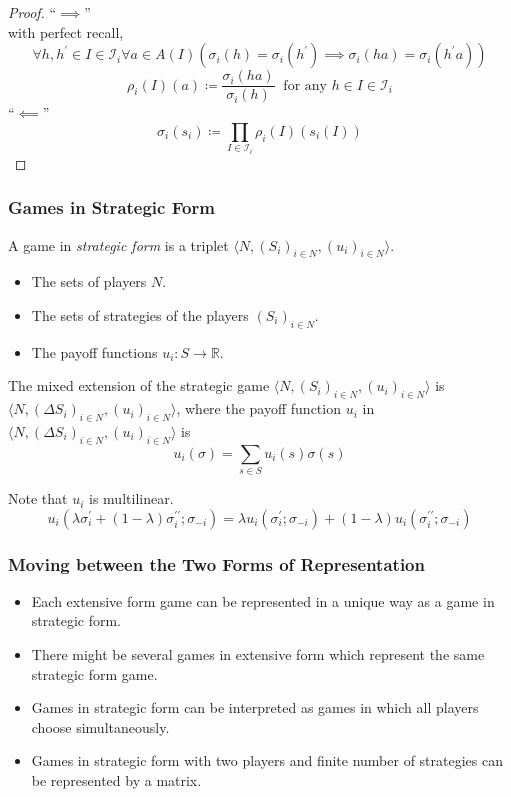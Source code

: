 \documentclass[UTF8,11pt,colorlinks,compress,openany]{beamer}%
\begin{document}
\begin{frame}\frametitle{}
\begin{proof}
	``$\implies$''\\
	with perfect recall,
	\[\forall h,h^\prime\in I\in\mathcal{I}_i\forall a\in A(I)\left(\sigma_i(h)=\sigma_i(h^\prime)\implies\sigma_i(ha)=\sigma_i(h^\prime a)\right)\]
	\[\rho_i(I)(a)\coloneqq \dfrac{\sigma_i(ha)}{\sigma_i(h)}\;\;\text{for any $h\in I\in\mathcal{I}_i$}\]
	``$\impliedby$''
	\[\sigma_i(s_i)\coloneqq \prod\limits_{I\in\mathcal{I}_i}\rho_i(I)(s_i(I))\]
\end{proof}
\end{frame}

\begin{frame}\frametitle{Games in Strategic Form}
\begin{definition}
	A game in \emph{strategic form} is a triplet $\langle N,(S_i)_{i\in N},(u_i)_{i\in N}\rangle$.
	\begin{itemize}
		\item The sets of players $N$.
		\item The sets of strategies of the players $(S_i)_{i\in N}$.
		\item The payoff functions $u_i: S\to\mathbb R$.
	\end{itemize}
\end{definition}
\begin{definition}
	The mixed extension of the strategic game $\langle N,(S_i)_{i\in N},(u_i)_{i\in N}\rangle$ is $\langle N,(\Delta S_i)_{i\in N},(u_i)_{i\in N}\rangle$, where the payoff function $u_i$ in $\langle N,(\Delta S_i)_{i\in N},(u_i)_{i\in N}\rangle$ is \[u_i(\sigma)=\sum\limits_{s\in S}u_i(s)\sigma(s)\]
\end{definition}
Note that $u_i$ is multilinear.
\[u_i(\lambda\sigma_i^\prime+(1-\lambda)\sigma_i^{\prime\prime};\sigma_{-i})=\lambda u_i(\sigma_i^\prime;\sigma_{-i})+(1-\lambda)u_i(\sigma_i^{\prime\prime};\sigma_{-i})\]
\end{frame}

\begin{frame}\frametitle{Moving between the Two Forms of Representation}
\begin{itemize}
	\item Each extensive form game can be represented in a unique way as a game in strategic form.
	\item There might be several games in extensive form which represent the same strategic form game.
	\item Games in strategic form can be interpreted as games in which all players choose simultaneously.
	\item Games in strategic form with two players and finite number of strategies can be represented by a matrix.
\end{itemize}
\end{frame}
\end{document}
